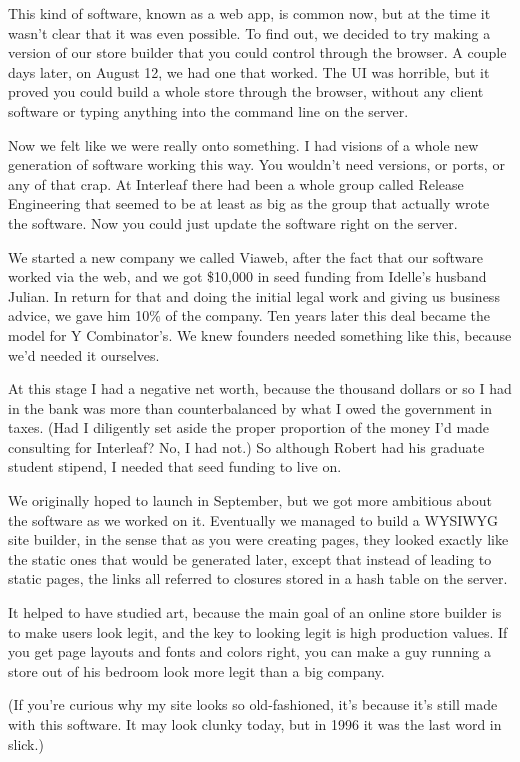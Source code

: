 This kind of software, known as a web app, is common now, but at the
time it wasn't clear that it was even possible. To find out, we decided
to try making a version of our store builder that you could control
through the browser. A couple days later, on August 12, we had one that
worked. The UI was horrible, but it proved you could build a whole store
through the browser, without any client software or typing anything into
the command line on the server.

Now we felt like we were really onto something. I had visions of a whole
new generation of software working this way. You wouldn't need versions,
or ports, or any of that crap. At Interleaf there had been a whole group
called Release Engineering that seemed to be at least as big as the
group that actually wrote the software. Now you could just update the
software right on the server.

We started a new company we called Viaweb, after the fact that our
software worked via the web, and we got \$10,000 in seed funding from
Idelle's husband Julian. In return for that and doing the initial legal
work and giving us business advice, we gave him 10\% of the company. Ten
years later this deal became the model for Y Combinator's. We knew
founders needed something like this, because we'd needed it ourselves.

At this stage I had a negative net worth, because the thousand dollars
or so I had in the bank was more than counterbalanced by what I owed the
government in taxes. (Had I diligently set aside the proper proportion
of the money I'd made consulting for Interleaf? No, I had not.) So
although Robert had his graduate student stipend, I needed that seed
funding to live on.

We originally hoped to launch in September, but we got more ambitious
about the software as we worked on it. Eventually we managed to build a
WYSIWYG site builder, in the sense that as you were creating pages, they
looked exactly like the static ones that would be generated later,
except that instead of leading to static pages, the links all referred
to closures stored in a hash table on the server.

It helped to have studied art, because the main goal of an online store
builder is to make users look legit, and the key to looking legit is
high production values. If you get page layouts and fonts and colors
right, you can make a guy running a store out of his bedroom look more
legit than a big company.

(If you're curious why my site looks so old-fashioned, it's because it's
still made with this software. It may look clunky today, but in 1996 it
was the last word in slick.)

